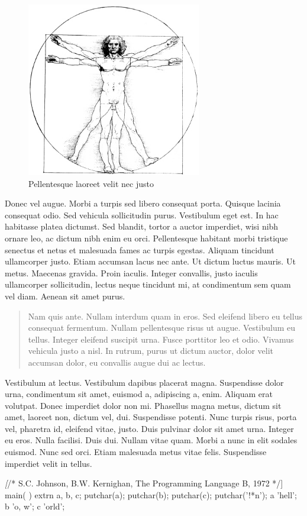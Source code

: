 \documentclass[cfonts]{nostarch}
\begin{document}
\begin{figure}[tp]
  \includegraphics[width=3in]{vitruvian}
  \caption{Pellentesque laoreet velit nec justo}
  \label{fig:one}
\end{figure}

Donec vel augue. Morbi a turpis sed libero consequat porta. Quisque
lacinia consequat odio. Sed vehicula sollicitudin purus. Vestibulum
eget est. In hac habitasse platea dictumst. Sed blandit, tortor a
auctor imperdiet, wisi nibh ornare leo, ac dictum nibh enim eu orci.
Pellentesque habitant morbi tristique senectus et netus et malesuada
fames ac turpis egestas.  Aliquam tincidunt ullamcorper justo. Etiam
accumsan lacus nec ante.  Ut dictum luctus mauris. Ut metus. Maecenas
gravida. Proin iaculis.  Integer convallis, justo iaculis ullamcorper
sollicitudin, lectus neque tincidunt mi, at condimentum sem quam vel
diam. Aenean sit amet purus.
\begin{quote}
  Nam quis ante. Nullam interdum quam in eros.  Sed eleifend libero eu
  tellus consequat fermentum. Nullam pellentesque risus ut augue.
  Vestibulum eu tellus. Integer eleifend suscipit urna. Fusce
  porttitor leo et odio. Vivamus vehicula justo a nisl. In rutrum,
  purus ut dictum auctor, dolor velit accumsan dolor, eu convallis
  augue dui ac lectus. 
\end{quote}

Vestibulum at lectus. Vestibulum dapibus placerat magna. Suspendisse
dolor urna, condimentum sit amet, euismod a, adipiscing a, enim.
Aliquam erat volutpat. Donec imperdiet dolor non mi. Phasellus magna
metus, dictum sit amet, laoreet non, dictum vel, dui. Suspendisse
potenti. Nunc turpis risus, porta vel, pharetra id, eleifend vitae,
justo. Duis pulvinar dolor sit amet urna. Integer eu eros. Nulla
facilisi. Duis dui.  Nullam vitae quam. Morbi a nunc in elit sodales
euismod. Nunc sed orci. Etiam malesuada metus vitae felis. Suspendisse
imperdiet velit in tellus.
\begin{quotation}
\lipsum[40-41]  
\end{quotation}
\lipsum[63]
\begin{Code}[commandchars=\\\[\]]
\textit[/* S.C. Johnson, B.W. Kernighan, The Programming Language B, 1972 */]
main( ) {
   extrn a, b, c;
   putchar(a); putchar(b); putchar(c); putchar('!*n');
 }
 a 'hell';
 b 'o, w';
 c 'orld';  
\end{Code}
\end{document}
